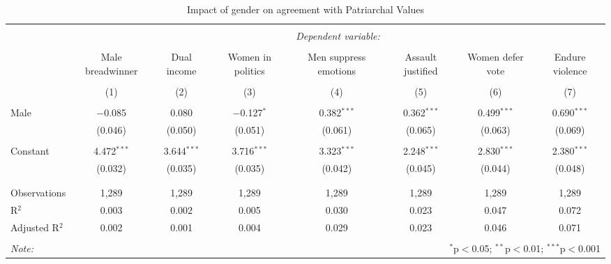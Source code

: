 
\begin{table}[!htbp] \centering 
  \caption{Impact of gender on agreement with Patriarchal Values} 
  \label{} 
\begin{tabular}{@{\extracolsep{5pt}}lccccccc} 
\\[-1.8ex]\hline 
\hline \\[-1.8ex] 
 & \multicolumn{7}{c}{\textit{Dependent variable:}} \\ 
\cline{2-8} 
\\[-1.8ex] & Male breadwinner & Dual income & Women in politics & Men suppress emotions & Assault justified & Women defer vote & Endure violence  \\ 
\\[-1.8ex] & (1) & (2) & (3) & (4) & (5) & (6) & (7)\\ 
\hline \\[-1.8ex] 
 Male & $-$0.085 & 0.080 & $-$0.127$^{*}$ & 0.382$^{***}$ & 0.362$^{***}$ & 0.499$^{***}$ & 0.690$^{***}$ \\ 
  & (0.046) & (0.050) & (0.051) & (0.061) & (0.065) & (0.063) & (0.069) \\ 
  & & & & & & & \\ 
 Constant & 4.472$^{***}$ & 3.644$^{***}$ & 3.716$^{***}$ & 3.323$^{***}$ & 2.248$^{***}$ & 2.830$^{***}$ & 2.380$^{***}$ \\ 
  & (0.032) & (0.035) & (0.035) & (0.042) & (0.045) & (0.044) & (0.048) \\ 
  & & & & & & & \\ 
\hline \\[-1.8ex] 
Observations & 1,289 & 1,289 & 1,289 & 1,289 & 1,289 & 1,289 & 1,289 \\ 
R$^{2}$ & 0.003 & 0.002 & 0.005 & 0.030 & 0.023 & 0.047 & 0.072 \\ 
Adjusted R$^{2}$ & 0.002 & 0.001 & 0.004 & 0.029 & 0.023 & 0.046 & 0.071 \\ 
\hline 
\hline \\[-1.8ex] 
\textit{Note:}  & \multicolumn{7}{r}{$^{*}$p$<$0.05; $^{**}$p$<$0.01; $^{***}$p$<$0.001} \\ 
\end{tabular} 
\end{table} 

